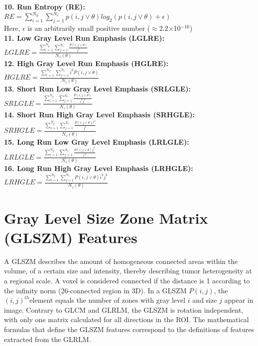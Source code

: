 \textbf{10. Run Entropy (RE):}\\
$RE =\sum _{i=1}^{N_{g}}\sum _{j=1}^{N_{r}}p\left(i,j\vee \theta \right)log_{2}\left(p\left(i,j\vee \theta \right)+\epsilon \right)$\\
Here, $\epsilon $ is an arbitrarily small positive number (${\approx}$2.2${\times}$10$^{-16}$)\\
\textbf{11. Low Gray Level Run Emphasis (LGLRE):}\\
$\textit{LGLRE}=\frac{\sum _{i=1}^{N_{g}}\sum _{j=1}^{N_{r}}\frac{P\left(i,j\vee \theta \right)}{i^{2}}}{N_{z}\left(\theta \right)}$\\
\textbf{12. High Gray Level Run Emphasis (HGLRE):}\\
$\textit{HGLRE}=\frac{\sum _{i=1}^{N_{g}}\sum _{j=1}^{N_{r}}i^{2}P\left(i,j\vee \theta \right)}{N_{z}\left(\theta \right)}$\\
\textbf{13. Short Run Low Gray Level Emphasis (SRLGLE):}\\
$\textit{SRLGLE}=\frac{\sum _{i=1}^{N_{g}}\sum _{j=1}^{N_{r}}\frac{P\left(i,j\vee \theta \right)}{i^{2}j^{2}}}{N_{z}\left(\theta \right)}$\\
\textbf{14. Short Run High Gray Level Emphasis (SRHGLE):}\\
$\textit{SRHGLE}=\frac{\sum _{i=1}^{N_{g}}\sum _{j=1}^{N_{r}}\frac{P\left(i,j\vee \theta \right)i^{2}}{j^{2}}}{N_{z}\left(\theta \right)}$\\
\textbf{15. Long Run Low Gray Level Emphasis (LRLGLE):}\\
$\textit{LRLGLE}=\frac{\sum _{i=1}^{N_{g}}\sum _{j=1}^{N_{r}}\frac{P\left(i,j\vee \theta \right)j^{2}}{i^{2}}}{N_{z}\left(\theta \right)}$\\
\textbf{16. Long Run High Gray Level Emphasis (LRHGLE):}\\
$\textit{LRHGLE}=\frac{\sum _{i=1}^{N_{g}}\sum _{j=1}^{N_{r}}P\left(i,j\vee \theta \right)i^{2}j^{2}}{N_{z}\left(\theta \right)}$

\section{Gray Level Size Zone Matrix (GLSZM) Features}

A GLSZM describes the amount of homogeneous connected areas within the volume, of a certain size and intensity, thereby describing tumor heterogeneity at a regional scale. A voxel is considered connected if the distance is 1 according to the infinity norm (26-connected region in 3D). In a GLSZM $P\left(i,j\right)$, the $\left(i,j\right)^{th}$element equals the number of zones with gray level $i$ and size $j$ appear in image. Contrary to GLCM and GLRLM, the GLSZM is rotation independent, with only one matrix calculated for all directions in the ROI. The mathematical formulas that define the GLSZM features correspond to the definitions of features extracted from the GLRLM.

